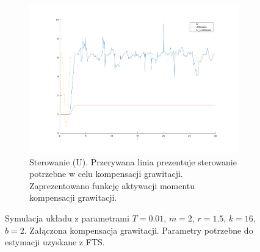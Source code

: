 \documentclass[a4paper, 10pt]{article}
\begin{document}
\begin{figure}
	\begin{subfigure}{.5\textwidth}
		\centering
		\includegraphics[width=\linewidth]{kompensacja_u}
		\caption{Sterowanie (U). Przerywana linia prezentuje sterowanie potrzebne w celu kompensacji grawitacji. Zaprezentowano funkcję aktywacji momentu kompensacji grawitacji.}
		\label{fig:kompensacja_u}
	\end{subfigure}
	
	\caption{Symulacja układu z parametrami $T=0.01$, $m = 2$, $r = 1.5$, $k = 16$, $b = 2$. Załączona kompensacja grawitacji. Parametry potrzebne do estymacji uzyskane z FTS.}
	\label{fig:kompensacja}
\end{figure}
\end{document}

